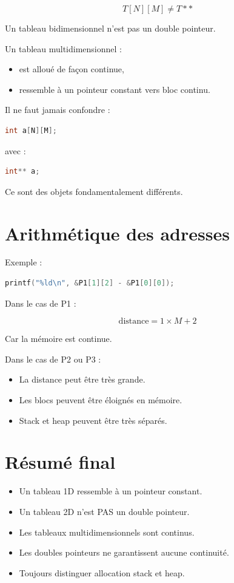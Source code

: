 \[
\boxed{
T[N][M] \neq T** 
}
\]

Un tableau bidimensionnel n’est pas un double pointeur.

Un tableau multidimensionnel :

\begin{itemize}
\item est alloué de façon continue,
\item ressemble à un pointeur constant vers bloc continu.
\end{itemize}

Il ne faut jamais confondre :

\begin{lstlisting}[language=C]
int a[N][M];
\end{lstlisting}

avec :

\begin{lstlisting}[language=C]
int** a;
\end{lstlisting}

Ce sont des objets fondamentalement différents.

\section{Arithmétique des adresses}

Exemple :

\begin{lstlisting}[language=C]
printf("%ld\n", &P1[1][2] - &P1[0][0]);
\end{lstlisting}

Dans le cas de P1 :

\[
\text{distance} = 1 \times M + 2
\]

Car la mémoire est continue.

Dans le cas de P2 ou P3 :

\begin{itemize}
\item La distance peut être très grande.
\item Les blocs peuvent être éloignés en mémoire.
\item Stack et heap peuvent être très séparés.
\end{itemize}

\section{Résumé final}

\begin{itemize}
\item Un tableau 1D ressemble à un pointeur constant.
\item Un tableau 2D n’est PAS un double pointeur.
\item Les tableaux multidimensionnels sont continus.
\item Les doubles pointeurs ne garantissent aucune continuité.
\item Toujours distinguer allocation stack et heap.
\end{itemize}

